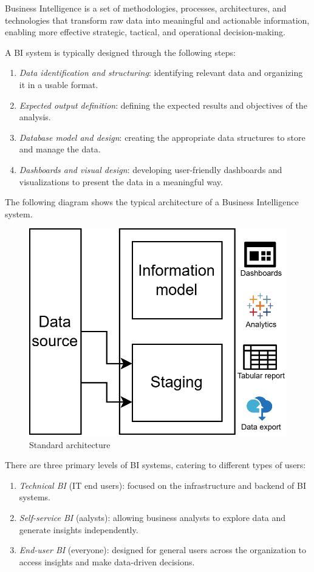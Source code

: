 \begin{definition}
    Business Intelligence is a set of methodologies, processes, architectures, and technologies that transform raw data into meaningful and actionable information, enabling more effective strategic, tactical, and operational decision-making.
\end{definition}
\noindent A BI system is typically designed through the following steps:
\begin{enumerate}
    \item \textit{Data identification and structuring}: identifying relevant data and organizing it in a usable format.
    \item \textit{Expected output definition}: defining the expected results and objectives of the analysis.
    \item \textit{Database model and design}: creating the appropriate data structures to store and manage the data.
    \item \textit{Dashboards and visual design}: developing user-friendly dashboards and visualizations to present the data in a meaningful way.
\end{enumerate}
\noindent The following diagram shows the typical architecture of a Business Intelligence system.
\begin{figure}[H]
    \centering
    \includegraphics[width=0.5\linewidth]{images/bis6.png}
    \caption{Standard architecture}
\end{figure}
There are three primary levels of BI systems, catering to different types of users:
\begin{enumerate}
    \item \textit{Technical BI} (IT end users): focused on the infrastructure and backend of BI systems.
    \item \textit{Self-service BI} (aalysts): allowing business analysts to explore data and generate insights independently.
    \item \textit{End-user BI} (everyone): designed for general users across the organization to access insights and make data-driven decisions.
\end{enumerate}

